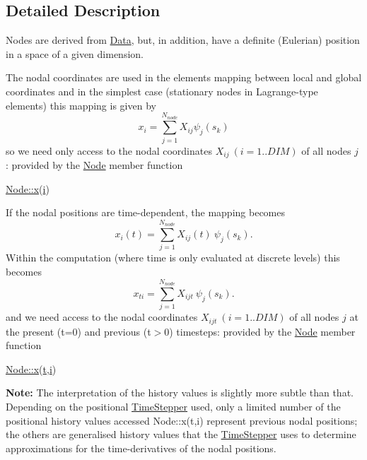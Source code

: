 \subsection{Detailed Description}
Nodes are derived from \hyperlink{classoomph_1_1Data}{Data}, but, in addition, have a definite (Eulerian) position in a space of a given dimension. 

The nodal coordinates are used in the elements\textquotesingle{} mapping between local and global coordinates and in the simplest case (stationary nodes in Lagrange-\/type elements) this mapping is given by \[ x_i = \sum_{j=1}^{N_{node}} X_{ij} \psi_{j}(s_k) \] so we need only access to the nodal coordinates $ X_{ij}\ (i=1..DIM) $ of all nodes $ j $ \+: provided by the \hyperlink{classoomph_1_1Node}{Node} member function 
\begin{DoxyCode}
\hyperlink{classoomph_1_1Node_a056f8e82da938369cd38541c5cdc598a}{Node::x}(\hyperlink{cfortran_8h_adb50e893b86b3e55e751a42eab3cba82}{i}) 
\end{DoxyCode}


If the nodal positions are time-\/dependent, the mapping becomes \[ x_i(t) = \sum_{j=1}^{N_{node}} X_{ij}(t) \ \psi_{j}(s_k). \] Within the computation (where time is only evaluated at discrete levels) this becomes \[ x_{ti} = \sum_{j=1}^{N_{node}} X_{ijt} \ \psi_{j}(s_k). \] and we need access to the nodal coordinates $ X_{ijt} \ (i=1..DIM) $ of all nodes $ j $ at the present (t=0) and previous (t$>$0) timesteps\+: provided by the \hyperlink{classoomph_1_1Node}{Node} member function 
\begin{DoxyCode}
\hyperlink{classoomph_1_1Node_a056f8e82da938369cd38541c5cdc598a}{Node::x}(\hyperlink{cfortran_8h_af6f0bd3dc13317f895c91323c25c2b8f}{t},\hyperlink{cfortran_8h_adb50e893b86b3e55e751a42eab3cba82}{i}) 
\end{DoxyCode}
 {\bfseries Note\+:} The interpretation of the history values is slightly more subtle than that. Depending on the positional \hyperlink{classoomph_1_1TimeStepper}{Time\+Stepper} used, only a limited number of the positional history values accessed {\ttfamily Node\+::x(t,i)} represent previous nodal positions; the others are generalised history values that the \hyperlink{classoomph_1_1TimeStepper}{Time\+Stepper} uses to determine approximations for the time-\/derivatives of the nodal positions.

